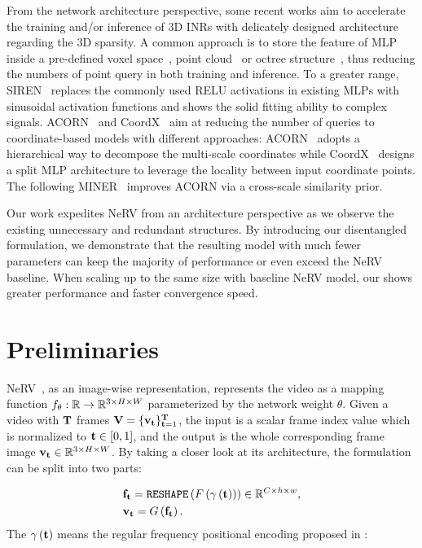 \documentclass[runningheads]{llncs}
\begin{document}
From the network architecture perspective, some recent works aim to accelerate the training and/or inference of 3D INRs with delicately designed architecture regarding the 3D sparsity. A common approach is to store the feature of MLP inside a pre-defined voxel space~\cite{liu2022learning}, point cloud~\cite{xu2022point} or octree structure~\cite{yu2021plenoctrees}, thus reducing the numbers of point query in both training and inference. To a greater range, SIREN~\cite{sitzmann2020implicit} replaces the commonly used RELU activations in existing MLPs with sinusoidal activation functions and shows the solid fitting ability to complex signals. ACORN~\cite{martel2021acorn} and CoordX~\cite{liang2022coordx} aim at reducing the number of queries to coordinate-based models with different approaches: ACORN~\cite{martel2021acorn} adopts a hierarchical way to decompose the multi-scale coordinates while CoordX~\cite{liang2022coordx} designs a split MLP architecture to leverage the locality between input coordinate points. The following MINER~\cite{saragadam2022miner} improves ACORN via a cross-scale similarity prior.

Our work expedites NeRV from an architecture perspective as we observe the existing unnecessary and redundant structures. By introducing our disentangled formulation, we demonstrate that the resulting model with much fewer parameters can keep the majority of performance or even exceed the NeRV baseline. When scaling up to the same size with baseline NeRV model, our \netname shows greater performance and faster convergence speed. \section{Preliminaries}
\label{Preliminaries}

NeRV~\cite{chen2021nerv}, as an image-wise representation, represents the video as a mapping function $f_\theta: \mathbb{R}\rightarrow\mathbb{R}^{3\times H\times W}$ parameterized by the network weight $\theta$. Given a video with $\mathbf{T}$ frames $\mathbf{V}=\{\mathbf{v}_{\mathbf{t}}\}_{\mathbf{t}=1}^{\mathbf{T}}$, the input is a scalar frame index value which is normalized to $\mathbf{t}\in\left[0, 1\right]$, and the output is the whole corresponding frame image $\mathbf{v}_{\mathbf{t}}\in\mathbb{R}^{3\times H\times W}$. By taking a closer look at its architecture, the formulation can be split into two parts:

\begin{equation}
\begin{aligned}
    &\mathbf{f}_{\mathbf{t}} = \texttt{RESHAPE}\left(F\left(\gamma\left(\mathbf{t}\right)\right)\right) \in \mathbb{R}^{C\times h\times w}, \\
    &\mathbf{v}_{\mathbf{t}} = G\left(\mathbf{f}_{\mathbf{t}}\right).
    \label{formula:NeRV}
\end{aligned}
\end{equation}
The $\gamma\left(\mathbf{t}\right)$ means the regular frequency positional encoding proposed in \cite{mildenhall2020nerf}:
\end{document}
